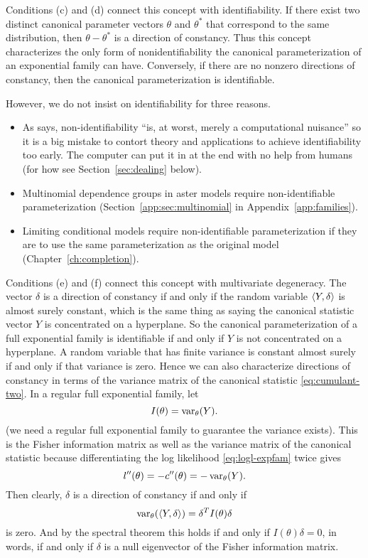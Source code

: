 Conditions (c) and (d) connect this concept with identifiability.
If there exist two distinct canonical parameter vectors $\theta$ and $\theta^*$
that correspond to the same distribution, then $\theta - \theta^*$ is a
direction of constancy.  Thus this concept characterizes the only form
of nonidentifiability the canonical parameterization of an exponential
family can have.  Conversely, if there are no nonzero directions of constancy,
then the canonical parameterization is identifiable.

However, we do not insist on identifiability for three reasons.
\begin{itemize}
\item
As \citet{geyer-gdor} says, non-identifiability ``is, at worst, merely
a computational nuisance'' so it is a big mistake to contort theory
and applications to achieve identifiability too early.  The computer
can put it in at the end with no help from humans
(for how see Section~\ref{sec:dealing} below).
\item Multinomial dependence groups in aster models require
non-identifiable parameterization
(Section~\ref{app:sec:multinomial} in Appendix~\ref{app:families}).
\item Limiting conditional models require non-identifiable parameterization
if they are to use the same parameterization as the original model
(Chapter~\ref{ch:completion}).
\end{itemize}

Conditions (e) and (f) connect this concept with multivariate degeneracy.
The vector $\delta$ is a direction of constancy if and only if the random
variable $\langle Y, \delta \rangle$ is almost surely constant, which is the
same thing as saying the canonical statistic vector $Y$ is concentrated
on a hyperplane.  So the canonical parameterization of a full exponential
family is identifiable if and only if $Y$ is not concentrated on a hyperplane.
A random variable that has finite variance is constant almost surely
if and only if that variance
is zero.  Hence we can also characterize directions of constancy in
terms of the variance matrix of the canonical statistic
\eqref{eq:cumulant-two}.  In a regular full exponential family, let
$$
   I(\theta) = \operatorname{var}_\theta(Y).
$$
(we need a regular full exponential family to guarantee the variance exists).
This is the Fisher information matrix as well as the variance matrix
of the canonical statistic because differentiating the log likelihood
\eqref{eq:logl-expfam} twice gives
$$
   l''(\theta) = - c''(\theta) = - \operatorname{var}_\theta(Y).
$$
Then clearly, $\delta$ is a direction of constancy if and only if
$$
   \operatorname{var}_\theta(\langle Y, \delta \rangle) = \delta^T I(\theta) \delta
$$
is zero.
And by the spectral theorem
\citet[Section~79]{halmos-vector-spaces} this holds if and only if
$I(\theta) \delta = 0$, in words, if and only if $\delta$ is a null
eigenvector of the Fisher information matrix.

